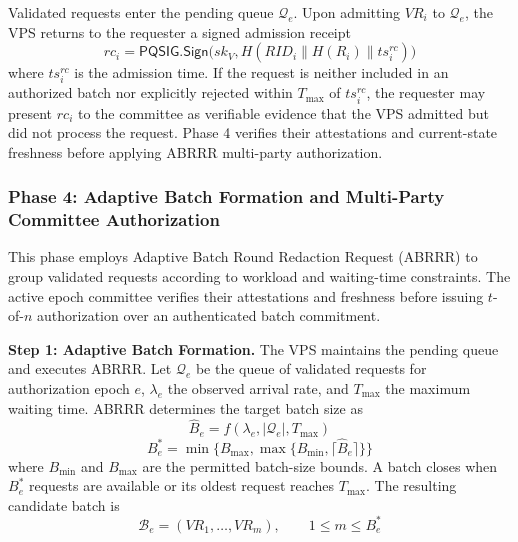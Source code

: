 \documentclass[lettersize,journal]{IEEEtran}
\begin{document}
    Validated requests enter the pending queue
    $\mathcal{Q}_e$.  {Upon admitting $VR_i$ to
    $\mathcal{Q}_e$, the VPS returns to the requester a signed admission
    receipt
    \begin{equation}
    rc_i=\mathsf{PQSIG.Sign}\big(sk_V,H(RID_i\parallel H(R_i)\parallel ts_i^{rc})\big)
    \end{equation}
    where $ts_i^{rc}$ is the admission time. If the request is neither
    included in an authorized batch nor explicitly rejected within
    $T_{\max}$ of $ts_i^{rc}$, the requester may present $rc_i$ to the
    committee as verifiable evidence that the VPS admitted but did not
    process the request.} Phase 4 verifies their
    attestations and current-state freshness
    before applying ABRRR multi-party
    authorization.
    
    
    
    
    \subsubsection*{\textbf{Phase 4: Adaptive Batch Formation
    and Multi-Party Committee Authorization}}
    
    This phase employs Adaptive Batch Round Redaction
    Request (ABRRR) to group validated requests according
    to workload and waiting-time constraints. The active
    epoch committee verifies their attestations and
    freshness before issuing $t$-of-$n$ authorization
    over an authenticated batch commitment.
    
    \medskip
    \noindent\textbf{Step 1: Adaptive Batch Formation.}
     {The VPS maintains the pending queue and executes ABRRR.}
    Let $\mathcal{Q}_e$ be the queue of validated requests
    for authorization epoch $e$, $\lambda_e$ the observed
    arrival rate, and $T_{\max}$ the maximum waiting time.
    ABRRR determines the target batch size as
    \begin{equation}
    \widehat{B}_e
    =f(\lambda_e,|\mathcal{Q}_e|,T_{\max})
    \end{equation}
    \begin{equation}
    B_e^{*}
    =\min\{B_{\max} {,}
    \max\{B_{\min},\lceil\widehat{B}_e\rceil\}\}
    \end{equation}
    where $B_{\min}$ and $B_{\max}$ are the permitted
    batch-size bounds. A batch closes when $B_e^{*}$
    requests are available or its oldest request reaches
    $T_{\max}$. The resulting candidate batch is
    \begin{equation}
    \mathcal{B}_e=
    (VR_1,\ldots,VR_m),
    \qquad 1\leq m\leq B_e^{*}
    \end{equation}
    
\end{document}
